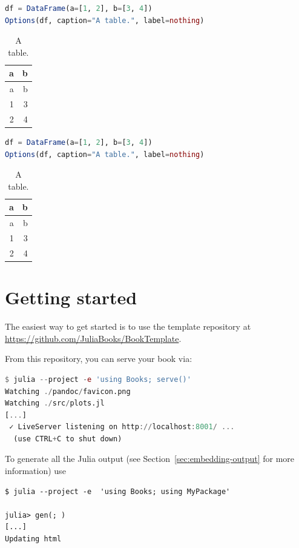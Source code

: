 \documentclass[
  notoc %
]{tufte-book}
\begin{document}
\begin{lstlisting}[language=Julia]
df = DataFrame(a=[1, 2], b=[3, 4])
Options(df, caption="A table.", label=nothing)
\end{lstlisting}

\begin{longtable}[]{@{}rr@{}}
\caption{A table.}\tabularnewline
\toprule
a & b \\
\midrule
\endfirsthead
\toprule
a & b \\
\midrule
\endhead
1 & 3 \\
2 & 4 \\
\bottomrule
\end{longtable}

\begin{lstlisting}[language=Julia]
df = DataFrame(a=[1, 2], b=[3, 4])
Options(df, caption="A table.", label=nothing)
\end{lstlisting}

\begin{longtable}[]{@{}rr@{}}
\caption{A table.}\tabularnewline
\toprule
a & b \\
\midrule
\endfirsthead
\toprule
a & b \\
\midrule
\endhead
1 & 3 \\
2 & 4 \\
\bottomrule
\end{longtable}

\hypertarget{sec:getting-started}{%
\chapter{Getting started}\label{sec:getting-started}}

The easiest way to get started is to use the template repository at
\url{https://github.com/JuliaBooks/BookTemplate}.

From this repository, you can serve your book via:

\begin{lstlisting}[language=Julia]
$ julia --project -e 'using Books; serve()'
Watching ./pandoc/favicon.png
Watching ./src/plots.jl
[...]
 ✓ LiveServer listening on http://localhost:8001/ ...
  (use CTRL+C to shut down)

\end{lstlisting}

To generate all the Julia output (see Section~\ref{sec:embedding-output}
for more information) use

\begin{lstlisting}
$ julia --project -e  'using Books; using MyPackage'

julia> gen(; )
[...]
Updating html
\end{lstlisting}
\end{document}
